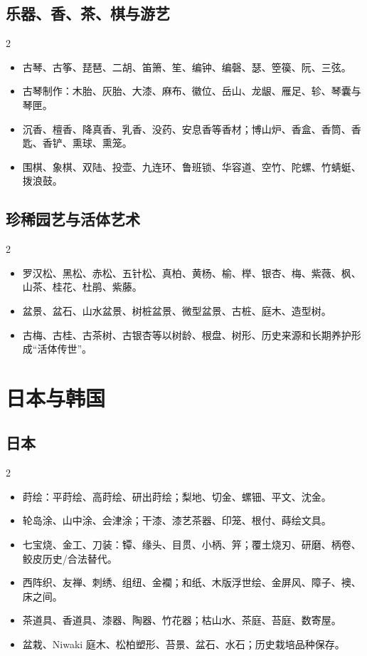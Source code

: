 \documentclass[lang=en,a4paper,11pt]{elegantpaper}
\begin{document}
\subsection{乐器、香、茶、棋与游艺}


\begin{multicols}{2}
\begin{itemize}
\item 古琴、古筝、琵琶、二胡、笛箫、笙、编钟、编磬、瑟、箜篌、阮、三弦。
\item 古琴制作：木胎、灰胎、大漆、麻布、徽位、岳山、龙龈、雁足、轸、琴囊与琴匣。
\item 沉香、檀香、降真香、乳香、没药、安息香等香材；博山炉、香盒、香筒、香匙、香铲、熏球、熏笼。
\item 围棋、象棋、双陆、投壶、九连环、鲁班锁、华容道、空竹、陀螺、竹蜻蜓、拨浪鼓。
\end{itemize}
\end{multicols}

\subsection{珍稀园艺与活体艺术}


\begin{multicols}{2}
\begin{itemize}
\item 罗汉松、黑松、赤松、五针松、真柏、黄杨、榆、榉、银杏、梅、紫薇、枫、山茶、桂花、杜鹃、紫藤。
\item 盆景、盆石、山水盆景、树桩盆景、微型盆景、古桩、庭木、造型树。
\item 古梅、古桂、古茶树、古银杏等以树龄、根盘、树形、历史来源和长期养护形成“活体传世”。
\end{itemize}
\end{multicols}

\section{日本与韩国}


\subsection{日本}


\begin{multicols}{2}
\begin{itemize}
\item 莳绘：平莳绘、高莳绘、研出莳绘；梨地、切金、螺钿、平文、沈金。
\item 轮岛涂、山中涂、会津涂；干漆、漆艺茶器、印笼、根付、蒔绘文具。
\item 七宝烧、金工、刀装：镡、缘头、目贯、小柄、笄；覆土烧刃、研磨、柄卷、鲛皮历史/合法替代。
\item 西阵织、友禅、刺绣、组纽、金襴；和纸、木版浮世绘、金屏风、障子、襖、床之间。
\item 茶道具、香道具、漆器、陶器、竹花器；枯山水、茶庭、苔庭、数寄屋。
\item 盆栽、Niwaki 庭木、松柏塑形、苔景、盆石、水石；历史栽培品种保存。
\end{itemize}
\end{multicols}
\end{document}
